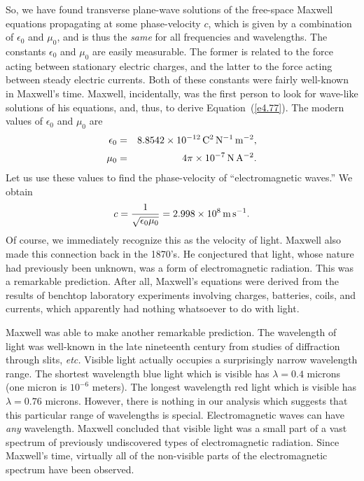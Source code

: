 So, we have found transverse plane-wave solutions of the free-space Maxwell equations 
propagating at some phase-velocity $c$, which is given by a combination of $\epsilon_0$ and
$\mu_0$, and is thus the {\em same}\/ for all frequencies and wavelengths. The constants $\epsilon_0$ and
$\mu_0$ are easily measurable. The former is related to the
force acting between stationary electric charges, and the latter to the force acting between steady electric currents.
Both of these constants were fairly well-known in Maxwell's time. Maxwell,
incidentally, was the first person to look for  wave-like solutions of
his equations, and, thus, to derive Equation~(\ref{e4.77}). The modern values of $\epsilon_0$
and $\mu_0$ are
\begin{eqnarray}
\epsilon_0& =& 8.8542\times 10^{-12} \,{\rm C}^2\,{\rm N}^{-1}\,{\rm m}^{-2},
\\[0.5ex]
\mu_0 &=&4\pi\times 10^{-7}\,{\rm N} \,{\rm A}^{-2}.
\end{eqnarray}
Let us use these values to find the phase-velocity of  ``electromagnetic
waves.'' We obtain
\begin{equation}\label{e4.79}
c = \frac{1}{\sqrt{\epsilon_0 \mu_0}} = 2.998\times 10^8\,{\rm m}\,{\rm s}^{-1}.
\end{equation}
Of course, we immediately recognize this as the velocity of light. Maxwell also made
this connection back in the 1870's. He conjectured that light, whose nature had
previously been unknown, was a form of electromagnetic radiation. This was
a remarkable
prediction. After all, Maxwell's equations were derived from the results of benchtop
laboratory experiments involving charges, batteries, coils, and currents, which apparently
had nothing
whatsoever to do with light. 

Maxwell was able to make another remarkable prediction. The wavelength of
light was well-known in the late nineteenth century from studies of diffraction
through slits, {\em etc.} 
Visible light actually occupies a surprisingly
narrow wavelength range. The shortest wavelength blue light which is visible
 has $\lambda= 0.4$ microns (one micron is $10^{-6}$ meters).
The longest wavelength red light which is visible has 
$\lambda= 0.76$ microns. However, there is nothing in our analysis which suggests that
this particular range of wavelengths is special. Electromagnetic waves
can have {\em any}\/ wavelength. 
Maxwell concluded that visible light was a small part of a vast spectrum of
previously undiscovered
types of electromagnetic radiation. Since Maxwell's time, virtually all of the
non-visible parts of the electromagnetic spectrum have been observed. 

